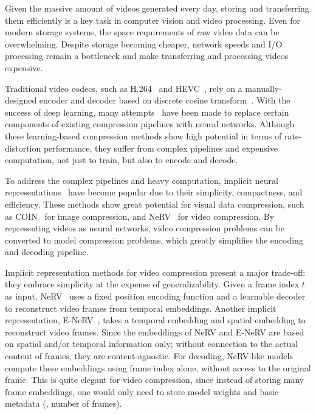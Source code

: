 \documentclass[10pt,twocolumn,letterpaper]{article}
\begin{document}
Given the massive amount of videos generated every day, storing and transferring them efficiently is a key task in computer vision and video processing.
Even for modern storage systems, the space requirements of raw video data can be overwhelming. 
Despite storage becoming cheaper, network speeds and I/O processing remain a bottleneck and make transferring and processing videos expensive.

Traditional video codecs, such as H.264~\cite{H264} and HEVC~\cite{hevc}, rely on a manually-designed encoder and decoder based on discrete cosine transform~\cite{dct}. 
With the success of deep learning, many attempts~\cite{lu2019dvc,rippel2021elfvc,Agustsson_2020_CVPR,Djelouah_2019_ICCV,Habibian_2019_ICCV,liu2019neural,9247134,Rippel_2019_ICCV,Wu_2018_ECCV} have been made to replace certain components of existing compression pipelines with neural networks. 
Although these learning-based compression methods show high potential in terms of rate-distortion performance, they suffer from complex pipelines and expensive computation, not just to train, but also to encode and decode.

To address the complex pipelines and heavy computation, implicit neural representations~\cite{pmlr-v97-rahaman19a,sitzmann2020implicit,schwarz2021graf,Chen_2019_CVPR,Park_2019_CVPR} have become popular due to their simplicity, compactness, and efficiency. 
These methods show great potential for visual data compression, such as COIN~\cite{dupont2021coin} for image compression, and NeRV~\cite{chen2021nerv} for video compression. 
By representing videos as neural networks, video compression problems can be converted to model compression problems, which greatly simplifies the encoding and decoding pipeline. 

Implicit representation methods for video compression present a major trade-off: they embrace simplicity at the expense of generalizability.
Given a frame index $t$ as input, NeRV~\cite{chen2021nerv} uses a fixed position encoding function and a learnable decoder to reconstruct video frames from temporal embeddings.
Another implicit representation, E-NeRV~\cite{li2022enerv}, takes a temporal embedding and spatial embedding to reconstruct video frames.
Since the embeddings of NeRV and E-NeRV are based on spatial and/or temporal information only; without connection to the actual content of frames, they are content-agnostic. 
For decoding, NeRV-like models compute these embeddings using frame index alone, without access to the original frame.
This is quite elegant for video compression, since instead of storing many frame embeddings, one would only need to store model weights and basic metadata (\eg, number of frames). 
\end{document}
